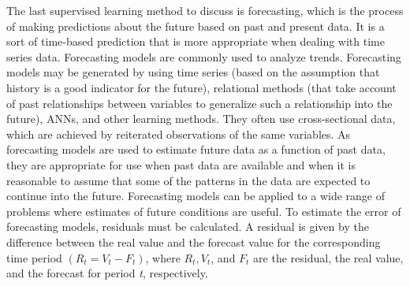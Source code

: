 The last supervised learning method to discuss is forecasting, which is the process of making predictions about the future based on past and present data. It is a sort of time-based prediction that is more appropriate when dealing with time series data. Forecasting models are commonly used to analyze trends. Forecasting models may be generated by using time series (based on the assumption that history is a good indicator for the future), relational methods (that take account of past relationships between variables to generalize such a relationship into the future), ANNs, and other learning methods. They often use cross-sectional data, which are achieved by reiterated observations of the same variables. As forecasting models are used to estimate future data as a function of past data, they are appropriate for use when past data are available and when it is reasonable to assume that some of the patterns in the data are expected to continue into the future. Forecasting models can be applied to a wide range of problems where estimates of future conditions are useful. To estimate the error of forecasting models, residuals must be calculated. A residual is given by the difference between the real value and the forecast value for the corresponding time period $(R{}_{t} =V{}_{t} - F{}_{t})$, where $R{}_{t}, V{}_{t}$, and $F{}_{t}$ are the residual, the real value, and the forecast for period \textit{t}, respectively.

